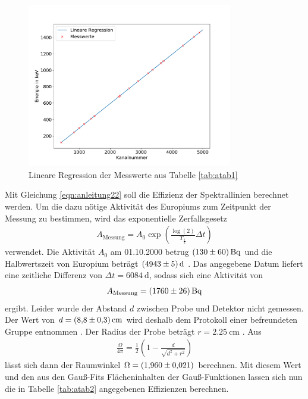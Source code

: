 \begin{figure}
\centering
\includegraphics[width=0.8\textwidth]{python/plots/kalibrierung.pdf}
\caption{Lineare Regression der Messwerte aus Tabelle \ref{tab:atab1}}
\label{fig:Kalibrierung}
\end{figure}
Mit Gleichung \eqref{eqn:anleitung22} soll die Effizienz der Spektrallinien berechnet werden.
Um die dazu nötige Aktivität des Europiums zum Zeitpunkt der Messung zu bestimmen, wird das exponentielle Zerfallsgesetz
\begin{align}
A_\text{Messung}=A_0\exp\left(\frac{\log(2)}{T_{\frac{1}{2}}}\Delta t\right)
\end{align}
verwendet.
Die Aktivität $A_0$ am 01.10.2000 betrug $\SI{130+-60}{\becquerel}$ und die Halbwertszeit von Europium beträgt $\SI{4943+-5}{\day}$ \cite{sample}.
Das angegebene Datum liefert eine zeitliche Differenz von $\Delta t=\SI{6084}{\day}$, sodass sich eine Aktivität von 
\begin{align*}
A_\text{Messung}=\SI{1760+-26}{\becquerel}
\end{align*}
ergibt.
Leider wurde der Abstand $d$ zwischen Probe und Detektor nicht gemessen. 
Der Wert von $d=\SI{8.8+-0.3}{\centi\meter}$ wird deshalb dem Protokoll einer befreundeten Gruppe entnommen \cite{abstand}.
Der Radius der Probe beträgt $r=\SI{2.25}{\centi\meter}$ \cite{sample}.
Aus
\begin{align}
\frac{\Omega}{4\pi}=\frac{1}{2}\left( 1- \frac{d}{\sqrt{d^2+r^2}}\right)
\end{align}
lässt sich dann der Raumwinkel $\Omega=\SI{1.96+-0.021}{}$ berechnen.
Mit diesem Wert und den aus den Gauß-Fits Flächeninhalten der Gauß-Funktionen lassen sich nun die in Tabelle \ref{tab:atab2} angegebenen Effizienzen berechnen.
